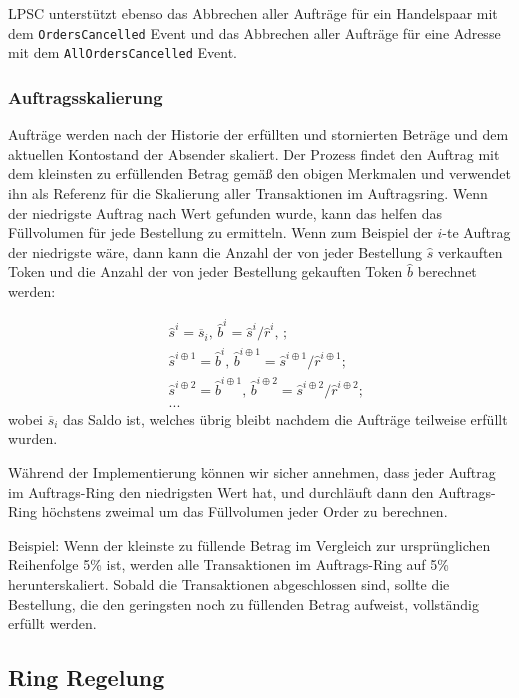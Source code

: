 \documentclass[UTF8,nofonts]{article}
\begin{document}
\begin{multicols}{2}
LPSC unterstützt ebenso das Abbrechen aller Aufträge für ein Handelspaar mit dem \verb|OrdersCancelled| Event und das Abbrechen aller Aufträge für eine Adresse mit dem \verb|AllOrdersCancelled| Event.

\subsubsection{Auftragsskalierung\label{sec:order_scaling}}
Aufträge werden nach der Historie der erfüllten und stornierten Beträge und dem aktuellen Kontostand der Absender skaliert. Der Prozess findet den Auftrag mit dem kleinsten zu erfüllenden Betrag gemäß den obigen Merkmalen und verwendet ihn als Referenz für die Skalierung aller Transaktionen im Auftragsring.
Wenn der niedrigste Auftrag nach Wert gefunden wurde, kann das helfen das Füllvolumen für jede Bestellung zu ermitteln. Wenn zum Beispiel der $i$-te Auftrag der niedrigste wäre,  dann kann die Anzahl der von jeder Bestellung $\hat{s}$ verkauften Token und die Anzahl der von jeder Bestellung gekauften Token $\hat{b}$ berechnet werden:

\[
\begin{split}
&\hat{s}^{i}=\overline{s}_i\text{, } \hat{b}^{i}=\hat{s}^{i}/ \hat{r}^i\text{, }\text{;}\\
&\hat{s}^{i\oplus 1}=\hat{b}^i\text{, } \hat{b}^{i\oplus 1}=\hat{s}^{i\oplus 1}/ \hat{r}^{i\oplus 1}\text{;}\\
&\hat{s}^{i\oplus 2}=\hat{b}^{i\oplus 1}\text{, } \hat{b}^{i\oplus 2}=\hat{s}^{i\oplus 2}/ \hat{r}^{i\oplus 2}\text{;}\\
& ...
\end{split}
\]
wobei $\overline{s}_i$ das Saldo ist, welches übrig bleibt nachdem die Aufträge teilweise erfüllt wurden.

Während der Implementierung können wir sicher annehmen, dass jeder Auftrag im Auftrags-Ring den niedrigsten Wert hat, und durchläuft dann den Auftrags-Ring höchstens zweimal um das Füllvolumen jeder Order zu berechnen.

Beispiel: Wenn der kleinste zu füllende Betrag im Vergleich zur ursprünglichen Reihenfolge 5\% ist, werden alle Transaktionen im Auftrags-Ring auf 5\% herunterskaliert. Sobald die Transaktionen abgeschlossen sind, sollte die Bestellung, die den geringsten noch zu füllenden Betrag aufweist, vollständig erfüllt werden.

\subsection{Ring Regelung\label{sec:settlement}}


\end{multicols}
\end{document}
